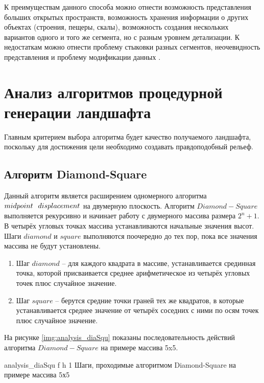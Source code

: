 К преимуществам данного способа можно отнести возможность представления больших открытых пространств, возможность хранения информации о других объектах (строения, пещеры, скалы), возможность создания нескольких вариантов одного и того же сегмента, но с разным уровнем детализации. 
К недостаткам можно отнести проблему стыковки разных сегментов, неочевидность представления и проблему модификации данных \cite{info_dataLandscapePresent}.

\section{Анализ алгоритмов процедурной генерации ландшафта}

Главным критерием выбора алгоритма будет качество получаемого ландшафта, поскольку для достижения цели необходимо создавать правдоподобный рельеф.

\subsection{Алгоритм Diamond-Square}

Данный алгоритм является расширением одномерного алгоритма $midpoint \hspace{0.25cm} displacement$ \cite{info_midpDipl} на двумерную плоскость. Алгоритм $Diamond-Square$ \cite{info_diaSqu} выполняется рекурсивно и начинает работу с двумерного массива размера $2^n + 1$. 
В четырёх угловых точках массива устанавливаются начальные значения высот. Шаги $diamond$ и $square$ выполняются поочередно до тех пор, пока все значения массива не будут установлены.

\begin{enumerate}[label={\arabic*)}]
    \item Шаг $diamond$ -- для каждого квадрата в массиве, устанавливается срединная точка, которой присваивается среднее арифметическое из четырёх угловых точек плюс случайное значение.
	\item Шаг $square$ -- берутся средние точки граней тех же квадратов, в которые устанавливается среднее значение от четырёх соседних с ними по осям точек плюс случайное значение.
\end{enumerate}

На рисунке \ref{img:analysis_diaSqu} показаны последовательность действий алгоритма $Diamond-Square$ на примере массива 5x5.

{analysis_diaSqu} %
{f} %
{h} %
{1\textwidth} %
{Шаги, проходимые алгоритмом Diamond-Square на примере массива 5х5 \cite{info_diaSquWiki}} %

